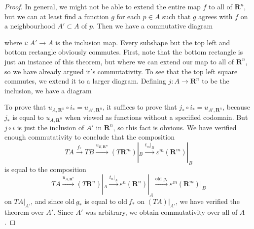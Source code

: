 \begin{proof}
    In general, we might not be able to extend the entire map $f$ to all of $\mathbf{R}^n$, but we can at least find a function $g$ for each $p \in A$ such that $g$ agrees with $f$ on a neighbourhood $A' \subset A$ of $p$. Then we have a commutative diagram
    \begin{center}
    \end{center}
    where $i: A' \to A$ is the inclusion map. Every subshape but the top left and bottom rectangle obviously commutes. First, note that the bottom rectangle is just an instance of this theorem, but where we can extend our map to all of $\mathbf{R}^n$, so we have already argued it's commutativity. To see that the top left square commutes, we extend it to a larger diagram. Defining $j: A \to \mathbf{R}^n$ to be the inclusion, we have a diagram
    \begin{center}
    \end{center}
    To prove that $u_{A,\mathbf{R}^n} \circ i_* = u_{A',\mathbf{R}^n}$, it suffices to prove that $j_* \circ i_* = u_{A', \mathbf{R}^n}$, because $j_*$ is equal to $u_{A,\mathbf{R}^n}$ when viewed as functions without a specified codomain. But $j \circ i$ is just the inclusion of $A'$ in $\mathbf{R}^n$, so this fact is obvious. We have verified enough commutativity to conclude that the composition
    \[ TA \xrightarrow{f_*} TB \xrightarrow{u_{B,\mathbf{R}^m}} (T\mathbf{R}^m)|_B \xrightarrow{t_m|_B} \varepsilon^m(\mathbf{R}^m)|_B \]
    is equal to the composition
    \[ TA \xrightarrow{u_{A,\mathbf{R}^n}} (T\mathbf{R}^n)|_A \xrightarrow{t_n|_A} \varepsilon^n(\mathbf{R}^n)|_A \xrightarrow{\text{old\ $g_*$}} \varepsilon^m(\mathbf{R}^m)|_B \]
    on $TA|_{A'}$, and since $\text{old}\ g_*$ is equal to $\text{old}\ f_*$ on $(TA)|_{A'}$, we have verified the theorem over $A'$. Since $A'$ was arbitrary, we obtain commutativity over all of $A$.
\end{proof}

